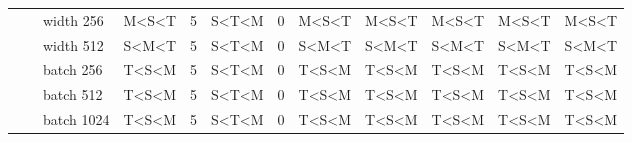 {\begin{longtable}{@{}lllllllccccc@{}}
     &  & width 256 & M<S<T & \num{5} & S<T<M & \num{0} & M<S<T & M<S<T & M<S<T & M<S<T & M<S<T \\
     &  & width 512 & S<M<T & \num{5} & S<T<M & \num{0} & S<M<T & S<M<T & S<M<T & S<M<T & S<M<T \\
     &  & batch 256 & T<S<M & \num{5} & S<T<M & \num{0} & T<S<M & T<S<M & T<S<M & T<S<M & T<S<M \\
     &  & batch 512 & T<S<M & \num{5} & S<T<M & \num{0} & T<S<M & T<S<M & T<S<M & T<S<M & T<S<M \\
     &  & batch 1024 & T<S<M & \num{5} & S<T<M & \num{0} & T<S<M & T<S<M & T<S<M & T<S<M & T<S<M \\
  \end{longtable}
}
